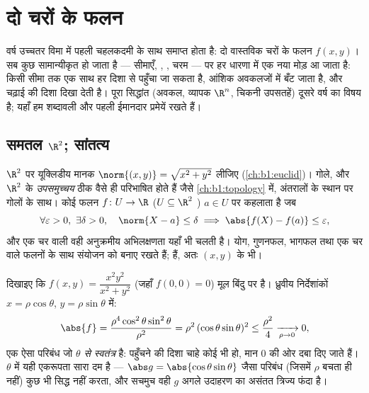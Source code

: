\chapter{दो चरों के फलन}\label{ch:b1:multivar}

वर्ष उच्चतर विमा में पहली चहलकदमी के साथ समाप्त होता है: दो वास्तविक चरों के
फलन $f(x, y)$। सब कुछ सामान्यीकृत हो जाता है --- सीमाएँ, , ,
चरम --- पर हर धारणा में एक नया मोड़ आ जाता है: किसी सीमा तक एक साथ हर दिशा
से पहुँचा जा सकता है,  आंशिक अवकलजों में बँट जाता है, और  चढ़ाई
की दिशा दिखा देती है। पूरा सिद्धांत (अवकल, व्यापक $\R^n$, चिकनी उपसतहें)
दूसरे वर्ष का विषय है; यहाँ हम शब्दावली और पहली ईमानदार प्रमेयें रखते हैं।

\section{समतल $\R^2$; सांतत्य}

\begin{definition}\label{def:b1:multivar:topology}
$\R^2$ पर यूक्लिडीय मानक $\norm{(x,y)} = \sqrt{x^2 + y^2}$ लीजिए
(\cref{ch:b1:euclid})।  गोले,  और $\R^2$ के \emph{
उपसमुच्चय} ठीक वैसे ही परिभाषित होते हैं जैसे \cref{ch:b1:topology} में,
अंतरालों के स्थान पर गोलों के साथ। कोई फलन $f \colon U \to \R$ ($U
\subseteq \R^2$ ) $a \in U$ पर \emph{} कहलाता है जब
\[
\forall\varepsilon > 0,\ \exists\delta > 0, \quad
\norm{X - a} \leq \delta \implies \abs{f(X) - f(a)} \leq
\varepsilon,
\]
और एक चर वाली वही अनुक्रमीय अभिलक्षणता यहाँ भी चलती है। योग, गुणनफल,
भागफल तथा एक चर वाले  फलनों के साथ संयोजन  को बनाए रखते हैं;
   हैं, अतः $(x,y)$ के  भी।
\end{definition}

\begin{example}[ध्रुवीय परिबंध --- किसी सीमा को सिद्ध करने का साफ़ रास्ता]
\label{ex:b1:multivar:polarbound}
दिखाइए कि $f(x, y) = \dfrac{x^2y^2}{x^2 + y^2}$ (जहाँ $f(0,0) = 0$) मूल
बिंदु पर  है। ध्रुवीय निर्देशांकों $x = \rho\cos\theta$, $y =
\rho\sin\theta$ में:
\[
\abs{f} = \frac{\rho^4\cos^2\theta\sin^2\theta}{\rho^2}
= \rho^2\,(\cos\theta\sin\theta)^2 \leq \frac{\rho^2}{4}
\xrightarrow[\rho \to 0]{} 0 ,
\]
एक ऐसा परिबंध जो \emph{$\theta$ से स्वतंत्र} है: पहुँचने की दिशा चाहे कोई
भी हो, मान $0$ की ओर दबा दिए जाते हैं। $\theta$ में यही एकरूपता सारा दम है
--- $\abs g = \abs{\cos\theta\sin\theta}$ जैसा परिबंध (जिसमें $\rho$ बचता
ही नहीं) कुछ भी सिद्ध नहीं करता, और सचमुच वही $g$ अगले उदाहरण का असंतत
त्रिज्य फंदा है।
\end{example}

